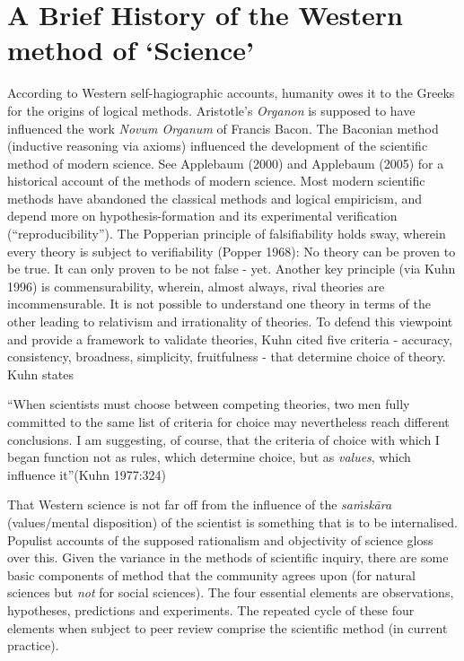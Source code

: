 \section*{A Brief History of the Western method of `Science'}

According to Western self-hagiographic accounts, humanity owes it to the Greeks for the origins of logical methods. Aristotle's {\sl Organon} is supposed to have influenced the work {\sl Novum Organum} of Francis Bacon.  The Baconian method (inductive reasoning via axioms) influenced the development of the scientific method of modern science. See Applebaum (2000) and Applebaum (2005) for a historical account of the methods of modern science. Most modern scientific methods have abandoned the classical methods and logical empiricism, and depend more on hypothesis-formation and its experimental verification (``reproducibility''). The Popperian principle of falsifiability holds sway, wherein every theory is subject to verifiability (Popper 1968): No theory can be proven to be true. It can only proven to be not false - yet.  Another key principle (via Kuhn 1996) is commensurability, wherein, almost always, rival theories are incommensurable. It is not possible to understand one theory in terms of the other leading to relativism and irrationality of theories. To defend this viewpoint and provide a framework to validate theories, Kuhn cited five criteria - accuracy, consistency, broadness, simplicity, fruitfulness - that determine choice of theory. Kuhn states
\begin{myquote}
``When scientists must choose between competing theories, two men fully committed to the same list of criteria for choice may nevertheless reach different conclusions. I am suggesting, of course, that the criteria of choice with which I began function not as rules, which determine choice, but as {\sl values}, which influence it''\hfill (Kuhn 1977:324)
\end{myquote}

That Western science is not far off from the influence of the {{\sl saṁskāra}\relax} (values/mental disposition) of the scientist is something that is to be internalised. Populist accounts of the supposed rationalism and objectivity of science gloss over this. Given the variance in the methods of scientific inquiry, there are some basic components of method that the community agrees upon (for natural sciences but {\sl not} for social sciences). The four essential elements are observations, hypotheses, predictions and experiments. The repeated cycle of these four elements when subject to peer review comprise the scientific method (in current practice).

